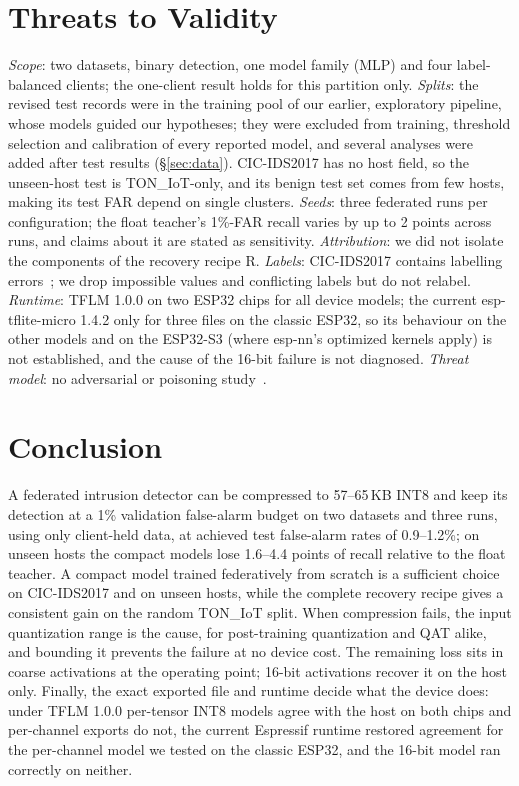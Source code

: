 \documentclass[sigplan,10pt,review,anonymous,nonacm]{acmart}
\newcommand{\cic}{CIC-IDS2017\xspace}
\newcommand{\ton}{TON\_IoT\xspace}
\begin{document}
\section{Threats to Validity}\label{sec:limits}
\emph{Scope}: two datasets, binary detection, one model family (MLP) and four label-balanced clients; the
one-client result holds for this partition only. \emph{Splits}: the revised test records were in the
training pool of our earlier, exploratory pipeline, whose models guided our hypotheses; they were excluded
from training, threshold selection and calibration of every reported model, and several analyses were
added after test results (\S\ref{sec:data}). \cic has no host field, so the unseen-host test is \ton-only,
and its benign test set comes from few hosts, making its test FAR depend on single clusters.
\emph{Seeds}: three federated runs per configuration; the float teacher's 1\%-FAR recall varies by up to
2 points across runs, and claims about it are stated as sensitivity. \emph{Attribution}: we did not
isolate the components of the recovery recipe R. \emph{Labels}: \cic contains labelling
errors~\cite{engelen2021troubleshooting}; we drop impossible values and conflicting labels but do not
relabel. \emph{Runtime}: TFLM 1.0.0 on two ESP32 chips for all device models; the current esp-tflite-micro
1.4.2 only for three files on the classic ESP32, so its behaviour on the other models and on the ESP32-S3
(where esp-nn's optimized kernels apply) is not established, and the cause of the 16-bit failure is not
diagnosed. \emph{Threat model}: no adversarial or poisoning study~\cite{nguyen2022flame}.

\section{Conclusion}
A federated intrusion detector can be compressed to 57--65\,KB INT8 and keep its detection at a 1\%
validation false-alarm budget on two datasets and three runs, using only client-held data, at achieved
test false-alarm rates of 0.9--1.2\%; on unseen hosts the compact models lose 1.6--4.4 points of recall
relative to the float teacher. A compact model trained federatively from scratch is a sufficient choice on
\cic and on unseen hosts, while the complete recovery recipe gives a consistent gain on the random \ton
split. When compression fails, the input quantization range is the cause, for post-training quantization
and QAT alike, and bounding it prevents the failure at no device cost. The remaining loss sits in coarse
activations at the operating point; 16-bit activations recover it on the host only. Finally, the exact
exported file and runtime decide what the device does: under TFLM 1.0.0 per-tensor INT8 models agree with
the host on both chips and per-channel exports do not, the current Espressif runtime restored agreement for
the per-channel model we tested on the classic ESP32, and the 16-bit model ran correctly on neither.
\end{document}
